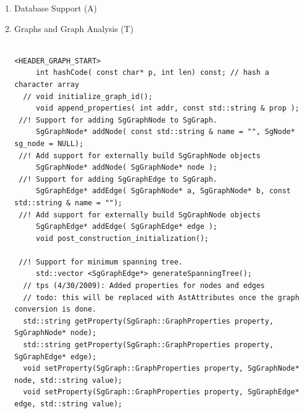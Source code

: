 \begin{enumerate}
\begin{lstlisting}
<QRTree.h>
     TableModel(QRTree *tree);
     int rowCount(const QModelIndex &parent = QModelIndex()) const;
     QVariant data(const QModelIndex &index, int role) const;
     QVariant headerData(int section, Qt::Orientation orientation,
                         int role = Qt::DisplayRole) const;


         \end{lstlisting}

   \item Database Support (A)

   \item Graphs and Graph Analysis (T)

\begin{lstlisting}

<HEADER_GRAPH_START>
     int hashCode( const char* p, int len) const; // hash a character array
  // void initialize_graph_id();
     void append_properties( int addr, const std::string & prop );
 //! Support for adding SgGraphNode to SgGraph.
     SgGraphNode* addNode( const std::string & name = "", SgNode* sg_node = NULL);
 //! Add support for externally build SgGraphNode objects
     SgGraphNode* addNode( SgGraphNode* node );
 //! Support for adding SgGraphEdge to SgGraph.
     SgGraphEdge* addEdge( SgGraphNode* a, SgGraphNode* b, const std::string & name = "");
 //! Add support for externally build SgGraphNode objects
     SgGraphEdge* addEdge( SgGraphEdge* edge );
     void post_construction_initialization();

 //! Support for minimum spanning tree.
     std::vector <SgGraphEdge*> generateSpanningTree();
  // tps (4/30/2009): Added properties for nodes and edges
  // todo: this will be replaced with AstAttributes once the graph conversion is done.
  std::string getProperty(SgGraph::GraphProperties property, SgGraphNode* node);
  std::string getProperty(SgGraph::GraphProperties property, SgGraphEdge* edge);
  void setProperty(SgGraph::GraphProperties property, SgGraphNode* node, std::string value);
  void setProperty(SgGraph::GraphProperties property, SgGraphEdge* edge, std::string value);


\end{lstlisting}
\end{enumerate}

